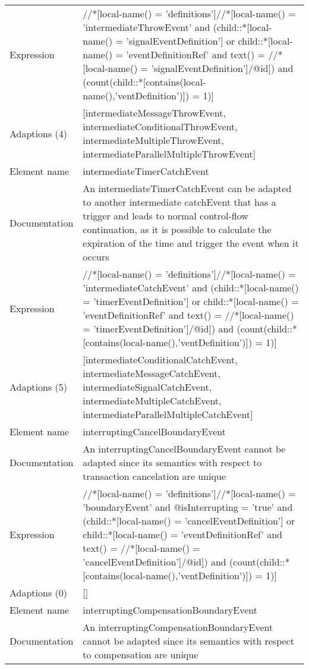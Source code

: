 \begin{center}
\begin{tiny}
\begin{longtable}{p{}|p{}}
Expression & //*[local-name() = 'definitions']//*[local-name() = 'intermediateThrowEvent' and (child::*[local-name() = 'signalEventDefinition'] or child::*[local-name() = 'eventDefinitionRef' and text() = //*[local-name() = 'signalEventDefinition']/@id]) and (count(child::*[contains(local-name(),'ventDefinition')]) = 1)]\\
\myrowcolour
Adaptions (4) & [intermediateMessageThrowEvent, intermediateConditionalThrowEvent, intermediateMultipleThrowEvent, intermediateParallelMultipleThrowEvent]\\
\midrule
Element name & intermediateTimerCatchEvent\\
\myrowcolour
Documentation &An intermediateTimerCatchEvent can be adapted to another intermediate catchEvent that has a trigger and leads to normal control-flow continuation, as it is possible to calculate the expiration of the time and trigger the event when it occurs\\
Expression & //*[local-name() = 'definitions']//*[local-name() = 'intermediateCatchEvent' and (child::*[local-name() = 'timerEventDefinition'] or child::*[local-name() = 'eventDefinitionRef' and text() = //*[local-name() = 'timerEventDefinition']/@id]) and (count(child::*[contains(local-name(),'ventDefinition')]) = 1)]\\
\myrowcolour
Adaptions (5) & [intermediateConditionalCatchEvent, intermediateMessageCatchEvent, intermediateSignalCatchEvent, intermediateMultipleCatchEvent, intermediateParallelMultipleCatchEvent]\\
\midrule
Element name & interruptingCancelBoundaryEvent\\
\myrowcolour
Documentation &An interruptingCancelBoundaryEvent cannot be adapted since its semantics with respect to transaction cancelation are unique\\
Expression & //*[local-name() = 'definitions']//*[local-name() = 'boundaryEvent' and @isInterrupting = 'true' and (child::*[local-name() = 'cancelEventDefinition'] or child::*[local-name() = 'eventDefinitionRef' and text() = //*[local-name() = 'cancelEventDefinition']/@id]) and (count(child::*[contains(local-name(),'ventDefinition')]) = 1)]\\
\myrowcolour
Adaptions (0) & []\\
\midrule
Element name & interruptingCompensationBoundaryEvent\\
\myrowcolour
Documentation &An interruptingCompensationBoundaryEvent cannot be adapted since its semantics with respect to compensation are unique\\

\end{longtable}
\end{tiny}
\end{center}

